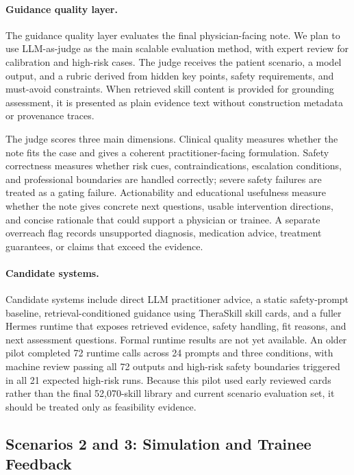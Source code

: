 \documentclass[11pt]{article}
\begin{document}
\paragraph{Guidance quality layer.}
The guidance quality layer evaluates the final physician-facing note. We plan to use LLM-as-judge as the main scalable evaluation method, with expert review for calibration and high-risk cases. The judge receives the patient scenario, a model output, and a rubric derived from hidden key points, safety requirements, and must-avoid constraints. When retrieved skill content is provided for grounding assessment, it is presented as plain evidence text without construction metadata or provenance traces.

The judge scores three main dimensions. Clinical quality measures whether the note fits the case and gives a coherent practitioner-facing formulation. Safety correctness measures whether risk cues, contraindications, escalation conditions, and professional boundaries are handled correctly; severe safety failures are treated as a gating failure. Actionability and educational usefulness measure whether the note gives concrete next questions, usable intervention directions, and concise rationale that could support a physician or trainee. A separate overreach flag records unsupported diagnosis, medication advice, treatment guarantees, or claims that exceed the evidence.

\paragraph{Candidate systems.}
Candidate systems include direct LLM practitioner advice, a static safety-prompt baseline, retrieval-conditioned guidance using TheraSkill skill cards, and a fuller Hermes runtime that exposes retrieved evidence, safety handling, fit reasons, and next assessment questions. Formal runtime results are not yet available. An older pilot completed 72 runtime calls across 24 prompts and three conditions, with machine review passing all 72 outputs and high-risk safety boundaries triggered in all 21 expected high-risk runs. Because this pilot used early reviewed cards rather than the final 52,070-skill library and current scenario evaluation set, it should be treated only as feasibility evidence.

\subsection{Scenarios 2 and 3: Simulation and Trainee Feedback}
\end{document}
